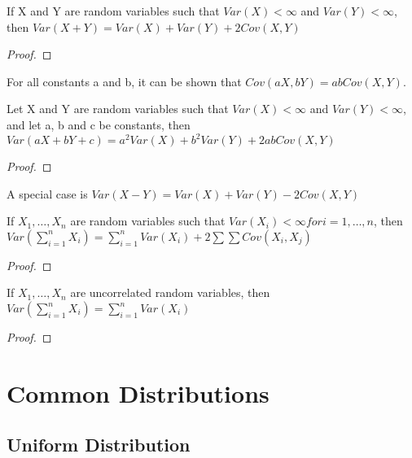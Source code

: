 \begin{proposition}
If X and Y are random variables such that $Var\left(X\right)<\infty$ and $Var\left(Y\right)<\infty$, then $Var\left(X+Y\right)=Var\left(X\right)+Var\left(Y\right)+2Cov\left(X,Y\right)$
\end{proposition}
\begin{proof}
\end{proof}

For all constants a and b, it can be shown that $Cov\left(aX,bY\right)=abCov\left(X,Y\right)$.

\begin{proposition}
Let X and Y are random variables such that $Var\left(X\right)<\infty$ and $Var\left(Y\right)<\infty$, and let a, b and c be constants, then $Var\left(aX+bY+c\right)=a^{2}Var\left(X\right)+b^{2}Var\left(Y\right)+2abCov\left(X,Y\right)$
\end{proposition}
\begin{proof}
\end{proof}

A special case is $Var\left(X-Y\right)=Var\left(X\right)+Var\left(Y\right)-2Cov\left(X,Y\right)$

\begin{proposition}
If $X_{1},\ldots,X_{n}$ are random variables such that $Var\left(X_{i}\right)<\infty for i=1,\ldots,n$, then $Var\left(\sum_{i=1}^{n}X_{i}\right)=\sum_{i=1}^{n}Var\left(X_{i}\right)+2\sum\sum Cov\left(X_{i},X_{j}\right)$
\end{proposition}
\begin{proof}
\end{proof}

\begin{proposition}
If $X_{1},\ldots,X_{n}$ are uncorrelated random variables, then $Var\left(\sum_{i=1}^{n}X_{i}\right)=\sum_{i=1}^{n}Var\left(X_{i}\right)$
\end{proposition}
\begin{proof}
\end{proof}


%
%

\section{Common Distributions}
\label{sec:probability_distributions}


\subsection{Uniform Distribution}


